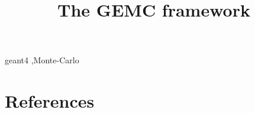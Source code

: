 \documentclass[review]{elsarticle}
\begin{document}
\begin{frontmatter}
	\title{The GEMC framework}

	
	

	\begin{keyword}
		geant4 \sep Monte-Carlo 
	\end{keyword}

\end{frontmatter}

\linenumbers









\section*{References}


\end{document}
